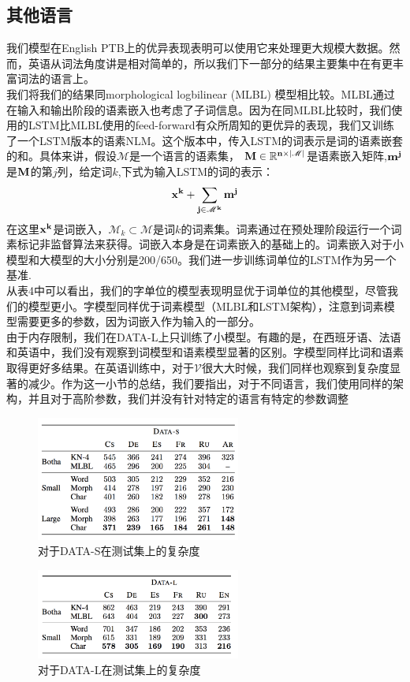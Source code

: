 \subsection{其他语言}
我们模型在English PTB上的优异表现表明可以使用它来处理更大规模大数据。然而，英语从词法角度讲是相对简单的，所以我们下一部分的结果主要集中在有更丰富词法的语言上。\\
我们将我们的结果同morphological logbilinear (MLBL) 模型相比较。MLBL通过在输入和输出阶段的语素嵌入也考虑了子词信息。因为在同MLBL比较时，我们使用的LSTM比MLBL使用的feed-forward有众所周知的更优异的表现，我们又训练了一个LSTM版本的语素NLM。这个版本中，传入LSTM的词表示是词的语素嵌套的和。具体来讲，假设$\mathscr{M}$是一个语言的语素集，
$\bf{M} \in \mathbb{R}^{n \times | \mathscr{M} |}$是语素嵌入矩阵,$\bf{m}^j$是$\bf{M}$的第$j$列，给定词$k$,下式为输入LSTM的词的表示：\\
\begin{equation}
\bf{x}^k + \sum_{j \in \mathscr{M}^k}\bf{m}^j
\end{equation}
在这里$\bf{x}^k$是词嵌入，$\mathscr{M}_k \subset \mathscr{M}$是词$k$的词素集。词素通过在预处理阶段运行一个词素标记非监督算法来获得。词嵌入本身是在词素嵌入的基础上的。词素嵌入对于小模型和大模型的大小分别是200/650。我们进一步训练词单位的LSTM作为另一个基准.\\
从表4中可以看出，我们的字单位的模型表现明显优于词单位的其他模型，尽管我们的模型更小。字模型同样优于词素模型（MLBL和LSTM架构），注意到词素模型需要更多的参数，因为词嵌入作为输入的一部分。\\
由于内存限制，我们在DATA-L上只训练了小模型。有趣的是，在西班牙语、法语和英语中，我们没有观察到词模型和语素模型显著的区别。字模型同样比词和语素取得更好多结果。在英语训练中，对于$\mathscr{V}$很大大时候，我们同样也观察到复杂度显著的减少。作为这一小节的总结，我们要指出，对于不同语言，我们使用同样的架构，并且对于高阶参数，我们并没有针对特定的语言有特定的参数调整\\

\begin{figure}[h]
  \centering
  \includegraphics[width=0.6\textwidth]{./images/table4}
  \caption{对于DATA-S在测试集上的复杂度}
\end{figure}
\begin{figure}[h]
  \centering
  \includegraphics[width=0.6\textwidth]{./images/table5}
  \caption{对于DATA-L在测试集上的复杂度}
\end{figure}


